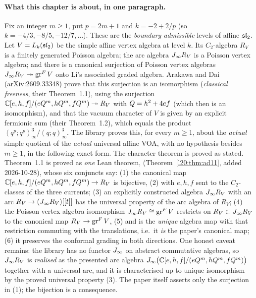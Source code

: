 \paragraph{What this chapter is about, in one paragraph.} Fix an integer $m\ge1$, put $p=2m+1$ and
$k=-2+2/p$ (so $k=-4/3,-8/5,-12/7,\dots$). These are the \emph{boundary admissible} levels of affine
$\mathfrak{sl}_2$. Let $V=L_k(\mathfrak{sl}_2)$ be the simple affine vertex algebra at level $k$. Its $C_2$-algebra
$R_V$ is a finitely generated Poisson algebra; the arc algebra $J_\infty R_V$ is a Poisson vertex algebra;
and there is a canonical surjection of Poisson vertex algebras $J_\infty R_V\twoheadrightarrow\operatorname{gr}^F V$
onto Li's associated graded algebra. Arakawa and Dai (arXiv:2609.33348) prove that this surjection is an
isomorphism (\emph{classical freeness}, their Theorem~1.1), using the surjection
${\mathbb{C}}[e,h,f]/(eQ^m,hQ^m,fQ^m)\twoheadrightarrow R_V$ with $Q=h^2+4ef$ (which then is an
isomorphism), and that the vacuum
character of $V$ is given by an explicit fermionic sum (their Theorem~1.2), which equals the product
$(q^p;q^p)_\infty^3/(q;q)_\infty^3$. The library proves this, for every $m\ge1$, about the
\emph{actual} simple quotient of the \emph{actual} universal affine VOA, with no hypothesis besides $m\ge1$, in the
following exact form. The character theorem is proved as stated. Theorem~1.1 is proved as \emph{one} Lean theorem,
 (Theorem~\ref{l20:thm:ad11}, added 2026-10-28), whose six conjuncts say: (1) the
canonical map ${\mathbb{C}}[e,h,f]/(eQ^m,hQ^m,fQ^m)\to R_V$ is bijective, (2) with $e,h,f$ sent to the
$C_2$-classes of the three currents; (3) an explicitly constructed algebra $J_\infty R_V$ with an arc
$R_V\to(J_\infty R_V)[[t]]$ has the universal property of the arc algebra of $R_V$; (4) the Poisson vertex algebra
isomorphism $J_\infty R_V\cong\operatorname{gr}^F V$ restricts on $R_V\subset J_\infty R_V$ to the canonical map
$R_V\to\operatorname{gr}^F V$, (5) and is the \emph{unique} algebra map with that restriction commuting with the translations, i.e.\ it
\emph{is} the paper's canonical map; (6) it preserves the conformal grading in both directions. One honest caveat
remains: the library has no functor $J_\infty$ on abstract commutative algebras, so $J_\infty R_V$ is \emph{realised}
as the presented arc algebra $J_\infty\bigl({\mathbb{C}}[e,h,f]/(eQ^m,hQ^m,fQ^m)\bigr)$ together with a
universal arc, and it is characterised up to unique isomorphism by the proved universal property (3). The paper itself
asserts only the surjection in (1); the bijection is a consequence.

